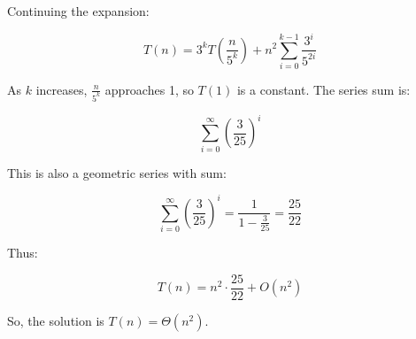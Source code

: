 \documentclass[11pt]{article}
\newenvironment{qparts}{\begin{enumerate}[{(}a{)}]}{\end{enumerate}}
\begin{document}
\begin{qparts}
Continuing the expansion:

\[
T(n) = 3^k T\left(\frac{n}{5^k}\right) + n^2 \sum_{i=0}^{k-1} \frac{3^i}{5^{2i}}
\]

As \( k \) increases, \( \frac{n}{5^k} \) approaches 1, so \( T(1) \) is a constant. The series sum is:

\[
\sum_{i=0}^{\infty} \left(\frac{3}{25}\right)^i
\]

This is also a geometric series with sum:

\[
\sum_{i=0}^{\infty} \left(\frac{3}{25}\right)^i = \frac{1}{1-\frac{3}{25}} = \frac{25}{22}
\]

Thus:

\[
T(n) = n^2 \cdot \frac{25}{22} + O(n^2)
\]

So, the solution is \( T(n) = \Theta(n^2) \).

\end{qparts}
\end{document}
